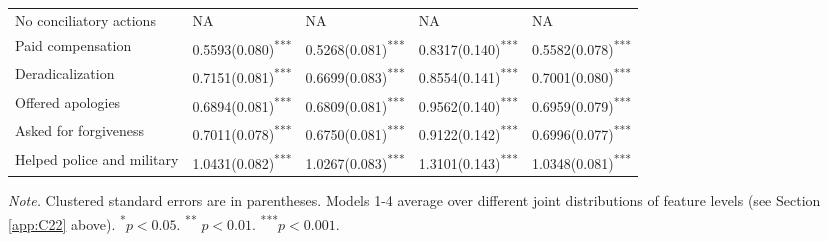 \begin{table}[H]
\begin{threeparttable}
\begin{tabular}{lllll}
No conciliatory actions & NA & NA & NA & NA \\ 
Paid compensation &  0.5593(0.080)\textsuperscript{***} & 0.5268(0.081)\textsuperscript{***} & 0.8317(0.140)\textsuperscript{***} & 0.5582(0.078)\textsuperscript{***}\\ 
Deradicalization & 0.7151(0.081)\textsuperscript{***} & 0.6699(0.083)\textsuperscript{***} & 0.8554(0.141)\textsuperscript{***} & 0.7001(0.080)\textsuperscript{***}\\ 
Offered apologies  & 0.6894(0.081)\textsuperscript{***} & 0.6809(0.081)\textsuperscript{***} & 0.9562(0.140)\textsuperscript{***} & 0.6959(0.079)\textsuperscript{***}\\ 
Asked for forgiveness & 0.7011(0.078)\textsuperscript{***} & 0.6750(0.081)\textsuperscript{***} & 0.9122(0.142)\textsuperscript{***} & 0.6996(0.077)\textsuperscript{***}\\ 
Helped police and military & 1.0431(0.082)\textsuperscript{***} & 1.0267(0.083)\textsuperscript{***} & 1.3101(0.143)\textsuperscript{***} & 1.0348(0.081)\textsuperscript{***}\\ 
\midrule
\bottomrule
\end{tabular}
\begin{tablenotes}
\footnotesize
\item[]\textit{Note.} Clustered standard errors are in parentheses. Models 1-4 average over different joint distributions of feature levels (see Section \ref{app:C22} above). \textsuperscript{*}$p < 0.05$. \textsuperscript{**} $p < 0.01$. \textsuperscript{***}$p < 0.001$.
\end{tablenotes}
\end{threeparttable}
\end{table}


